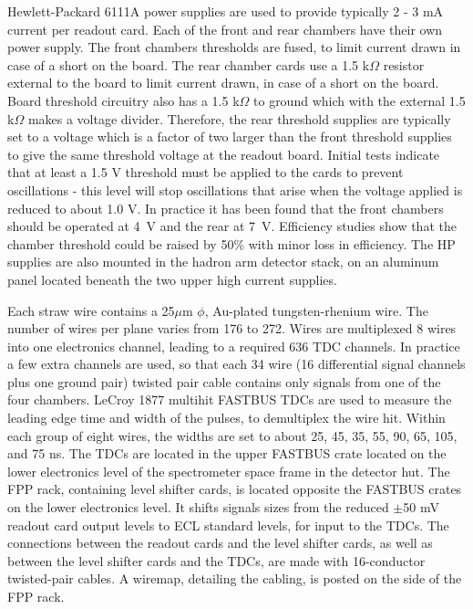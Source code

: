 Hewlett-Packard 6111A power supplies are used to provide typically
2 - 3 mA current per readout card.
Each of the front and rear chambers have their own power supply.  
The front chambers thresholds are fused, 
to limit current drawn in case of a short on the board.
The rear chamber cards use a 1.5 k$\Omega$ resistor external to the board
to limit current drawn, in case of a short on the board.
Board threshold circuitry also has a 1.5 k$\Omega$ to ground which
with the external 1.5 k$\Omega$ makes a voltage divider. Therefore,
the rear threshold supplies are typically set to a voltage which is
a factor of two larger than the front threshold supplies to give the
same threshold voltage at the readout board.
Initial tests indicate that at least a 1.5 V threshold must be applied to the
cards to prevent oscillations - this level will stop oscillations that arise
when the voltage applied is reduced to about 1.0 V.
In practice it has been found that the front chambers should be operated
at 4~V and the rear at 7~V. Efficiency studies show that the chamber
threshold could be raised by 50\% with minor loss in efficiency.
The HP supplies are also mounted in the hadron arm detector stack, on an
aluminum panel located beneath the two upper high current supplies.

Each straw wire contains a 25$\mu$m $\phi$, Au-plated
tungsten-rhenium wire.
The number of wires per plane varies from 176 to 272.
Wires are multiplexed 8 wires into one electronics channel,
leading to a required 636 TDC channels.
In practice a few extra channels are used, so that each 34 wire
(16 differential signal channels plus one ground pair)
twisted pair cable contains only signals from one of the four chambers.
LeCroy 1877 multihit FASTBUS TDCs are used to measure the leading edge time
and width of the pulses, to demultiplex the wire hit.
Within each group of eight wires, the widths are set to about
25, 45, 35, 55, 90, 65, 105, and 75 ns.
The TDCs are located in the upper FASTBUS crate located on the lower
electronics level of the spectrometer space frame in the detector hut.
The FPP rack, containing level shifter cards, is located opposite the
FASTBUS crates on the lower electronics level.
It shifts signals sizes from the reduced $\pm$50 mV readout card output levels
to ECL standard levels, for input to the TDCs.
The connections between the readout cards and the level shifter cards,
as well as between the level shifter cards and the TDCs,
are made with 16-conductor twisted-pair cables. 
A wiremap, detailing the cabling, is posted on the side of the FPP rack.

